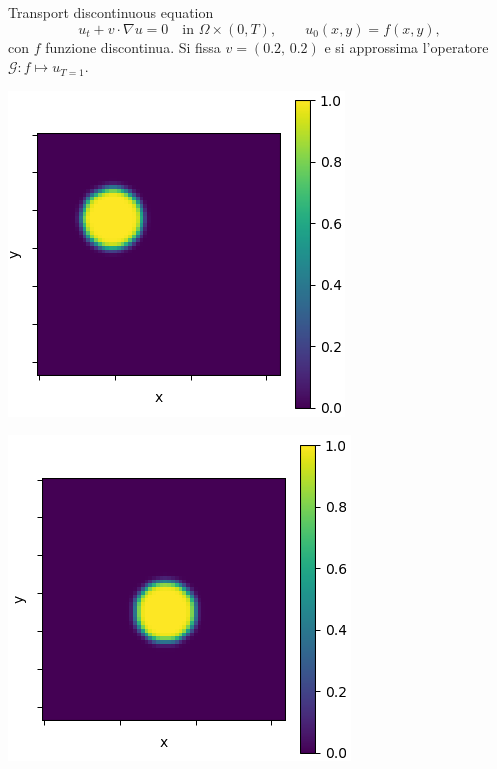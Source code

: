 \documentclass[aspectratio=169]{beamer}
\begin{document}
\begin{frame}[t]{Transport discontinuous equation}
    \[
        u_{t} + v \cdot \nabla u = 0 \quad \text{in } \Omega \times (0, T), \quad\quad u_{0}(x, y) = f(x, y),
    \]
    con $f$ funzione discontinua. Si fissa $v = (0.2, \, 0.2)$ e si approssima l'operatore $\mathcal{G}: f\mapsto u_{T=1}$.
    \begin{center}
        \begin{minipage}{0.24\textwidth}
            \includegraphics[width=\textwidth]{operators/discTrans/input.png}
        \end{minipage}
        \hfill
        \begin{minipage}{0.24\textwidth}
            \includegraphics[width=\textwidth]{operators/discTrans/output.png}

\end{minipage}
\end{center}
\end{frame}
\end{document}
